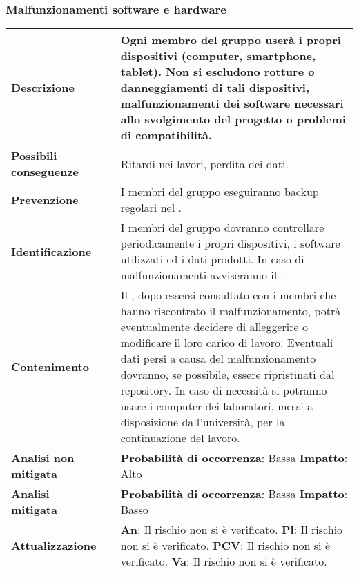 \subsubsection {Malfunzionamenti software e hardware}
\label{subsec:malfunzionamenttiSwHw}
\small
\begin{table}[H]
	\begin{center}			
		\begin{tabular}{p{2.5cm}p{0.5cm}p{11cm}}
			\arrayrulecolor{lightgray}
			
			\toprule				
			\textbf{Descrizione}
			& &
			Ogni membro del gruppo userà i propri dispositivi (computer, smartphone, tablet).
			Non si escludono rotture o danneggiamenti di tali dispositivi, malfunzionamenti dei software necessari allo svolgimento del progetto o problemi di compatibilità.
			\\
			\midrule
			\textbf{Possibili \newline conseguenze}
			& &
			Ritardi nei lavori, perdita dei dati.
			\\
			\midrule
			\textbf{Prevenzione}
			& &
			I membri del gruppo eseguiranno backup regolari nel \glo{Repository}{repository}.
			\\
			\midrule
			\textbf{Identificazione}
			& &
			I membri del gruppo dovranno controllare periodicamente i propri dispositivi, i software utilizzati ed i dati prodotti. In caso di malfunzionamenti avviseranno il \responsabilediprogetto.
			\\
			\midrule
			\textbf{Contenimento}
			& &
			Il \responsabilediprogetto, dopo essersi consultato con i membri che hanno riscontrato il malfunzionamento, potrà eventualmente decidere di alleggerire o modificare il loro carico di lavoro. Eventuali dati persi a causa del malfunzionamento dovranno, se possibile, essere ripristinati dal repository. In caso di necessità si potranno usare i computer dei laboratori, messi a disposizione dall'università, per la continuazione del lavoro.
			\\
			\midrule
			\textbf{Analisi \newline non mitigata}
			& &
			\textbf{Probabilità di occorrenza}: Bassa
			\newline
			\textbf{Impatto}: Alto
			\\
			\midrule
			\textbf{Analisi \newline mitigata}
			& &
			\textbf{Probabilità di occorrenza}: Bassa
			\newline
			\textbf{Impatto}: Basso
			\\
			\midrule
			\textbf{Attualizzazione}
			& &
			\textbf{An}: Il rischio non si è verificato.
			\newline
			\textbf{Pl}: Il rischio non si è verificato.
			\newline
			\textbf{PCV}: Il rischio non si è verificato.
			\newline
			\textbf{Va}: Il rischio non si è verificato.
			\\
			
			\bottomrule	
		\end{tabular}
	\end{center}
\end{table}			


